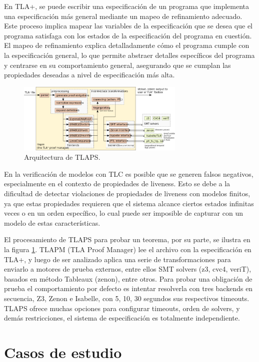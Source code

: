 \documentclass[runningheads]{llncs}
\begin{document}
En TLA+, se puede escribir una especificación de un programa que implementa una especificación más general mediante un mapeo de refinamiento adecuado. Este proceso implica mapear las variables de la especificación que se desea que el programa satisfaga con los estados de la especificación del programa en cuestión. El mapeo de refinamiento explica detalladamente cómo el programa cumple con la especificación general, lo que permite abstraer detalles específicos del programa y centrarse en su comportamiento general, asegurando que se cumplan las propiedades deseadas a nivel de especificación más alta.
% 
\begin{figure}
    \centering
    \includegraphics[width=8cm]{tlaps_arch.png}
    \caption{Arquitectura de TLAPS.}
    \label{fig1}
\end{figure}
%
En la verificación de modelos con TLC es posible que se generen falsos negativos, especialmente en el contexto de propiedades de liveness. Esto se debe a la dificultad de detectar violaciones de propiedades de liveness con modelos finitos, ya que estas propiedades requieren que el sistema alcance ciertos estados infinitas veces o en un orden específico, lo cual puede ser imposible de capturar con un modelo de estas características.

El procesamiento de TLAPS para probar un teorema, por su parte, se ilustra en la figura \ref{fig1}. TLAPM (TLA Proof Manager) lee el archivo con la especificación en TLA+, y luego de ser analizado aplica una serie de transformaciones para enviarlo a motores de prueba externos, entre ellos SMT solvers (z3, cvc4, veriT), basados en método Tableaux (zenon), entre otros. 
Para probar una obligación de prueba el comportamiento por defecto es intentar resolverla con tres backends en secuencia, Z3, Zenon e Isabelle, con 5, 10, 30 segundos sus respectivos timeouts.
TLAPS ofrece muchas opciones para configurar timeouts, orden de solvers, y demás restricciones, el sistema de especificación es totalmente independiente. %

\section{Casos de estudio}
\end{document}

